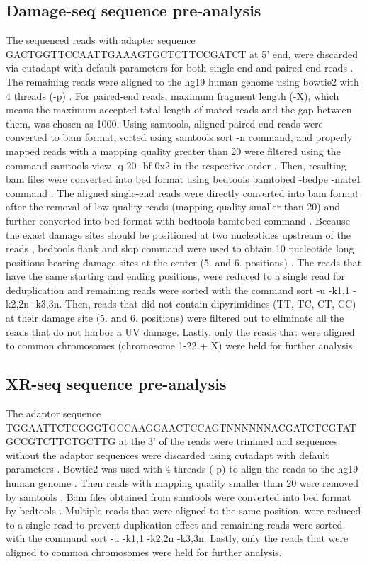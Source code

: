 \subsection{Damage-seq sequence pre-analysis}
The sequenced reads with adapter sequence GACTGGTTCCAATTGAAAGTGCTCTTCCGATCT at 5' end, were discarded via cutadapt with default parameters for both single-end and paired-end reads \citep{martin2011cutadapt}. The remaining reads were aligned to the hg19 human genome using bowtie2 with 4 threads (-p) \citep{langmead2012fast}. For paired-end reads, maximum fragment length (-X), which means the maximum accepted total length of mated reads and the gap between them, was chosen as 1000. Using samtools, aligned paired-end reads were converted to bam format, sorted using samtools sort -n command, and properly mapped reads with a mapping quality greater than 20 were filtered using the command samtools view -q 20 -bf 0x2 in the respective order \citep{li2009sequence}. Then, resulting bam files were converted into bed format using bedtools bamtobed -bedpe -mate1 command \citep{quinlan2010bedtools}. The aligned single-end reads were directly converted into bam format after the removal of low quality reads (mapping quality smaller than 20) and further converted into bed format with bedtools bamtobed command \citep{quinlan2010bedtools}. Because the exact damage sites should be positioned at two nucleotides upstream of the reads \citep{li2009sequence}, bedtools flank and slop command were used to obtain 10 nucleotide long positions bearing damage sites at the center (5. and 6. positions) \citep{quinlan2010bedtools}. The reads that have the same starting and ending positions, were reduced to a single read for deduplication and remaining reads were sorted with the command sort -u -k1,1 -k2,2n -k3,3n. Then, reads that did not contain dipyrimidines (TT, TC, CT, CC) at their damage site (5. and 6. positions) were filtered out to eliminate all the reads that do not harbor a UV damage. Lastly, only the reads that were aligned to common chromosomes (chromosome 1-22 + X) were held for further analysis.

\subsection{XR-seq sequence pre-analysis}
The adaptor sequence TGGAATTCTCGGGTGCCAAGGAACTCCAGTNNNNNNACGATCTCGTATGCCGTCTTCTGCTTG at the 3' of the reads were trimmed and sequences without the adaptor sequences were discarded using cutadapt with default parameters \citep{martin2011cutadapt}. Bowtie2 was used with 4 threads (-p) to align the reads to the hg19 human genome \citep{langmead2012fast}. Then reads with mapping quality smaller than 20 were removed by samtools \citep{li2009sequence}. Bam files obtained from samtools were converted into bed format by bedtools \citep{quinlan2010bedtools}. Multiple reads that were aligned to the same position, were reduced to a single read to prevent duplication effect and remaining reads were sorted with the command sort -u -k1,1 -k2,2n -k3,3n. Lastly, only the reads that were aligned to common chromosomes were held for further analysis.

